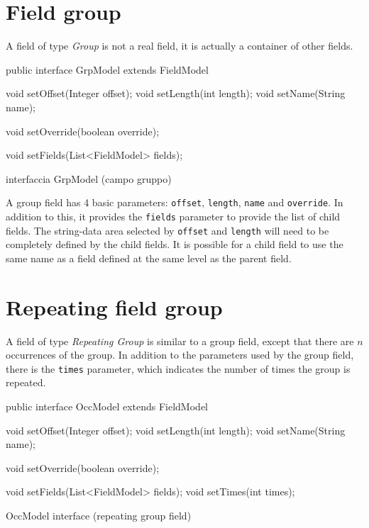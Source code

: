 \section{Field group}
A field of type \textsl{Group} is not a real field, it is actually a container 
of other fields.

\begin{elisting}[!htb]
\begin{javacode}
public interface GrpModel extends FieldModel {
    void setOffset(Integer offset);
    void setLength(int length);
    void setName(String name);
    
    void setOverride(boolean override);
    
    void setFields(List<FieldModel> fields);
}
\end{javacode}
\caption{interfaccia GrpModel (campo gruppo)}
\label{lst:GrpModel}
\end{elisting}

A group field has 4 basic parameters: \verb!offset!, \verb!length!, \verb!name! 
and \verb!override!. 
In addition to this, it provides the \verb!fields! parameter to provide the list 
of child fields. 
The string-data area selected by \verb!offset! and \verb!length! will need to be 
completely defined by the child fields. 
It is possible for a child field to use the same name as a field defined at the 
same level as the parent field.

\section{Repeating field group}
A field of type \textsl{Repeating Group} is similar to a group field, except 
that there are $n$ occurrences of the group. 
In addition to the parameters used by the group field, there is the \verb!times! 
parameter, which indicates the number of times the group is repeated.

\begin{elisting}[!htb]
\begin{javacode}
public interface OccModel extends  FieldModel {
    void setOffset(Integer offset);
    void setLength(int length);
    void setName(String name);
    
    void setOverride(boolean override);
    
    void setFields(List<FieldModel> fields);
    void setTimes(int times);
}
\end{javacode}
\caption{OccModel interface (repeating group field)}
\label{lst:OccModel}
\end{elisting}

